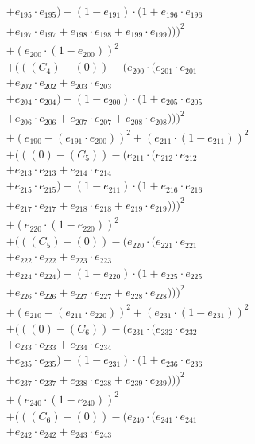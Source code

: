 \documentclass[10pt, a4paper]{article}
\begin{document}
\begin{align*}
& + e_{195} \cdot e_{195}) - (1 - e_{191}) \cdot (1 + e_{196} \cdot e_{196} \\
& + e_{197} \cdot e_{197} + e_{198} \cdot e_{198} + e_{199} \cdot e_{199})))^{2} \\
& + (e_{200} \cdot (1 - e_{200}))^{2} \\
& + (((C_{4}) - (0)) - (e_{200} \cdot (e_{201} \cdot e_{201} \\
& + e_{202} \cdot e_{202} + e_{203} \cdot e_{203} \\
& + e_{204} \cdot e_{204}) - (1 - e_{200}) \cdot (1 + e_{205} \cdot e_{205} \\
& + e_{206} \cdot e_{206} + e_{207} \cdot e_{207} + e_{208} \cdot e_{208})))^{2} \\
& + (e_{190} - (e_{191} \cdot e_{200}))^{2} + (e_{211} \cdot (1 - e_{211}))^{2} \\
& + (((0) - (C_{5})) - (e_{211} \cdot (e_{212} \cdot e_{212} \\
& + e_{213} \cdot e_{213} + e_{214} \cdot e_{214} \\
& + e_{215} \cdot e_{215}) - (1 - e_{211}) \cdot (1 + e_{216} \cdot e_{216} \\
& + e_{217} \cdot e_{217} + e_{218} \cdot e_{218} + e_{219} \cdot e_{219})))^{2} \\
& + (e_{220} \cdot (1 - e_{220}))^{2} \\
& + (((C_{5}) - (0)) - (e_{220} \cdot (e_{221} \cdot e_{221} \\
& + e_{222} \cdot e_{222} + e_{223} \cdot e_{223} \\
& + e_{224} \cdot e_{224}) - (1 - e_{220}) \cdot (1 + e_{225} \cdot e_{225} \\
& + e_{226} \cdot e_{226} + e_{227} \cdot e_{227} + e_{228} \cdot e_{228})))^{2} \\
& + (e_{210} - (e_{211} \cdot e_{220}))^{2} + (e_{231} \cdot (1 - e_{231}))^{2} \\
& + (((0) - (C_{6})) - (e_{231} \cdot (e_{232} \cdot e_{232} \\
& + e_{233} \cdot e_{233} + e_{234} \cdot e_{234} \\
& + e_{235} \cdot e_{235}) - (1 - e_{231}) \cdot (1 + e_{236} \cdot e_{236} \\
& + e_{237} \cdot e_{237} + e_{238} \cdot e_{238} + e_{239} \cdot e_{239})))^{2} \\
& + (e_{240} \cdot (1 - e_{240}))^{2} \\
& + (((C_{6}) - (0)) - (e_{240} \cdot (e_{241} \cdot e_{241} \\
& + e_{242} \cdot e_{242} + e_{243} \cdot e_{243} \\

\end{align*}
\end{document}

